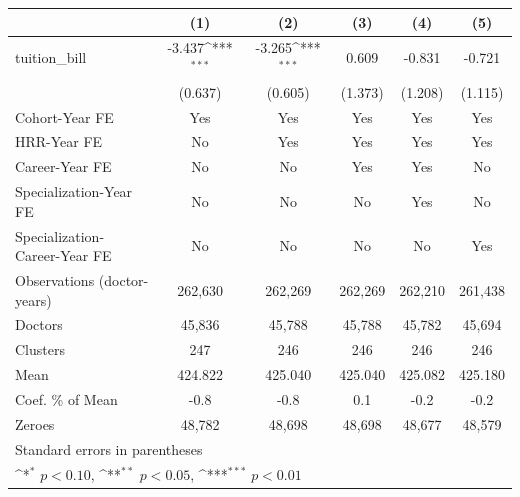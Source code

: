 {
\def\sym#1{\ifmmode^{#1}\else\(^{#1}\)\fi}
\begin{tabular}{l*{5}{c}}
\hline\hline
                    &\multicolumn{1}{c}{(1)}         &\multicolumn{1}{c}{(2)}         &\multicolumn{1}{c}{(3)}         &\multicolumn{1}{c}{(4)}         &\multicolumn{1}{c}{(5)}         \\
\hline
tuition\_bill        &      -3.437\sym{***}&      -3.265\sym{***}&       0.609         &      -0.831         &      -0.721         \\
                    &     (0.637)         &     (0.605)         &     (1.373)         &     (1.208)         &     (1.115)         \\
[1em]
Cohort-Year FE      &         Yes         &         Yes         &         Yes         &         Yes         &         Yes         \\
[1em]
HRR-Year FE         &          No         &         Yes         &         Yes         &         Yes         &         Yes         \\
[1em]
Career-Year FE      &          No         &          No         &         Yes         &         Yes         &          No         \\
[1em]
Specialization-Year FE&          No         &          No         &          No         &         Yes         &          No         \\
[1em]
Specialization-Career-Year FE&          No         &          No         &          No         &          No         &         Yes         \\
\hline
Observations (doctor-years)&     262,630         &     262,269         &     262,269         &     262,210         &     261,438         \\
Doctors             &      45,836         &      45,788         &      45,788         &      45,782         &      45,694         \\
Clusters            &         247         &         246         &         246         &         246         &         246         \\
Mean                &     424.822         &     425.040         &     425.040         &     425.082         &     425.180         \\
Coef. \% of Mean    &        -0.8         &        -0.8         &         0.1         &        -0.2         &        -0.2         \\
Zeroes              &      48,782         &      48,698         &      48,698         &      48,677         &      48,579         \\
\hline\hline
\multicolumn{6}{l}{\footnotesize Standard errors in parentheses}\\
\multicolumn{6}{l}{\footnotesize \sym{*} \(p<0.10\), \sym{**} \(p<0.05\), \sym{***} \(p<0.01\)}\\
\end{tabular}
}
